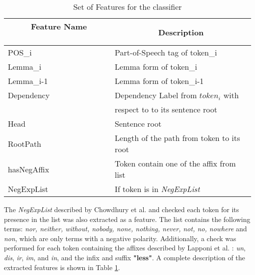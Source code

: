 \begin{table}
\centering
\caption{\label{tab:features} Set of Features for the classifier}
\begin{tabular}{ll}
\hline
\multicolumn{1}{c}{\textbf{~ ~ ~ Feature Name~ ~ ~ ~}} & \multicolumn{1}{c}{\textbf{Description}}                                                                                              \\ 
\hline
POS_i                                                 & Part-of-Speech tag of token_i\\
Lemma_i                                               & Lemma form of token_i\\
Lemma_{i-1}                                           & Lemma form of token_{i-1}\\
Dependency                                            & Dependency Label from $token_{i}$ with\\& respect to to its sentence root \\
Head                                                  & Sentence root\\
RootPath                                              & Length of the path from token to its root\\
hasNegAffix                                           & Token contain one of the affix from list \\
NegExpList                                            & If token is in \textit{NegExpList}\\
\hline
\end{tabular}
\end{table}


The \textit{NegExpList} described by Chowdhury et al. \cite{chowdhury2012fbk} and checked each token for its presence in the list was also extracted as a feature. The list contains the following terms: \textit{nor, neither, without, nobody, none, nothing, never, not, no, nowhere} and  \textit{non}, which are only terms with a negative polarity. Additionally, a check was performed for each token containing the affixes described by Lapponi et al. \cite{lapponi2012uio}: \textit{un}, \textit{dis}, \textit{ir}, \textit{im}, and \textit{in}, and the infix and suffix \textbf{"less"}. A complete description of the extracted features is shown in Table \ref{tab:features}.
